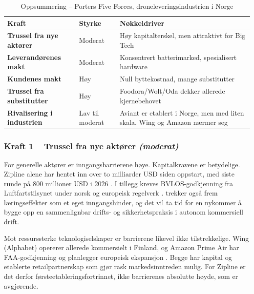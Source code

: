 \begin{table}[h!]
\centering
\caption{Oppsummering -- Porters Five Forces, droneleveringsindustrien i
Norge}
\label{tab:five_forces}
\renewcommand{\arraystretch}{1.4}
\begin{tabularx}{\textwidth}{
  >{\bfseries}p{5.2cm}
  >{\centering\arraybackslash}p{2.5cm}
  X
}
\toprule
\rowcolor{tableheader}\color{white}Kraft &
  \color{white}Styrke &
  \color{white}Nøkkeldriver \\
\midrule
\rowcolor{tablerow}
Trussel fra nye aktører    & \cellcolor{medorange} Moderat    & Høy
kapitalterskel, men attraktivt for Big Tech \\
Leverandørenes makt        & \cellcolor{medorange} Moderat    & Konsentrert
batterimarked, spesialisert hardware \\
\rowcolor{tablerow}
Kundenes makt              & \cellcolor{highred}   Høy        & Null
byttekostnad, mange substitutter \\
Trussel fra substitutter   & \cellcolor{highred}   Høy        &
Foodora/Wolt/Oda dekker allerede kjernebehovet \\
\rowcolor{tablerow}
Rivalisering i industrien  & \cellcolor{lowgreen}  Lav til moderat  & Aviant
er etablert i Norge, men med liten skala. Wing og Amazon nærmer seg \\
\bottomrule
\end{tabularx}
\end{table}

\subsubsection{Kraft 1 -- Trussel fra nye aktører
\normalfont\textit{(moderat)}}
For generelle aktører er inngangsbarrierene høye. Kapitalkravene er
betydelige. Zipline alene har hentet inn over to milliarder USD siden
oppstart, med siste runde på 800 millioner USD i 2026
\parencite{korosec2026_zipline}. I tillegg kreves BVLOS-godkjenning fra
Luftfartstilsynet under norsk og europeisk regelverk
\parencite{lovdata2024_bsla72, luftfartstilsynet2025_aicn0925}.
\textcite[7]{porter1980} trekker også frem
læringseffekter som et eget inngangshinder, og det vil ta tid for en nykommer
å bygge opp en sammenlignbar drifts- og sikkerhetspraksis i autonom
kommersiell drift.

Mot ressurssterke teknologiselskaper er barrierene likevel ikke
tilstrekkelige. Wing (Alphabet) opererer allerede kommersielt i Finland, og
Amazon Prime Air har FAA-godkjenning og planlegger europeisk ekspansjon
\parencite{wing2024, amazonair2024}. Begge har kapital og etablerte
retailpartnerskap som gjør rask markedsinntreden mulig. For Zipline er det
derfor førsteetableringsfortrinnet, ikke barrierenes absolutte høyde, som er
avgjørende.

